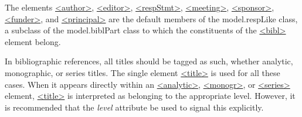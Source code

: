  The elements \hyperref[TEI.author]{<author>}, \hyperref[TEI.editor]{<editor>}, \hyperref[TEI.respStmt]{<respStmt>}, \hyperref[TEI.meeting]{<meeting>}, \hyperref[TEI.sponsor]{<sponsor>}, \hyperref[TEI.funder]{<funder>}, and \hyperref[TEI.principal]{<principal>} are the default members of the \textsf{model.respLike} class, a subclass of the \textsf{model.biblPart} class to which the constituents of the \hyperref[TEI.bibl]{<bibl>} element belong.\par
In bibliographic references, all titles should be tagged as such, whether analytic, monographic, or series titles. The single element \hyperref[TEI.title]{<title>} is used for all these cases. When it appears directly within an \hyperref[TEI.analytic]{<analytic>}, \hyperref[TEI.monogr]{<monogr>}, or \hyperref[TEI.series]{<series>} element, \hyperref[TEI.title]{<title>} is interpreted as belonging to the appropriate level. However, it is recommended that the {\itshape level} attribute be used to signal this explicitly.\par
